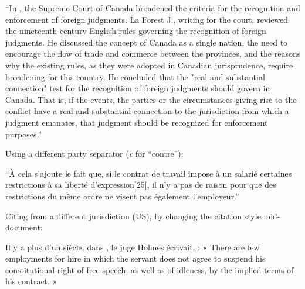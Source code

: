 \begin{myquotation}
``In , the Supreme Court of Canada broadened the criteria for the recognition and enforcement of foreign judgments. La Forest J., writing for the court, reviewed the nineteenth-century English rules governing the recognition of foreign judgments. He discussed the concept of Canada as a single nation, the need to encourage the flow of trade and commerce between the provinces, and the reasons why the existing rules, as they were adopted in Canadian jurisprudence, require broadening for this country. He concluded that the "real and substantial connection" test for the recognition of foreign judgments should govern in Canada. That is, if the events, the parties or the circumstances giving rise to the conflict have a real and substantial connection to the jurisdiction from which a judgment emanates, that judgment should be recognized for enforcement purposes.''
\end{myquotation}

\p Using a different party separator (\textit{c} for ``contre''):

{}

\begin{myquotation}
``À cela s’ajoute le fait que, si le contrat de travail impose à un salarié certaines restrictions à sa liberté d’expression[25], il n’y a pas de raison pour que des restrictions du même ordre ne visent pas également l’employeur.''
\end{myquotation}

\p Citing from a different jurisdiction (US), by changing the citation style mid-document:
\begin{myquotation}
Il y a plus d’un siècle, dans \lcsetstyleindigo{}\marginpar{$\leftarrow$ \sffamily\small\lccurrentstyle}\lcsetstylemcgill, le juge Holmes écrivait,  : « There are few employments for hire in which the servant does not agree to suspend his constitutional right of free speech, as well as of idleness, by the implied terms of his contract. »
\end{myquotation}

